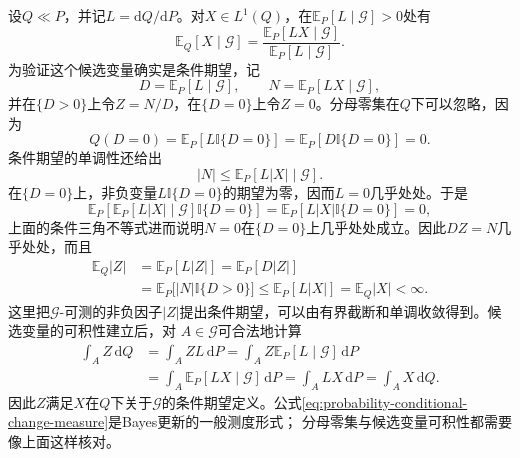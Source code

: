 设\(Q\ll P\)，并记\(L=\mathrm{d}Q/\mathrm{d}P\)。对\(X\in L^1(Q)\)，在\(\mathbb{E}_P[L\mid\mathcal{G}]>0\)处有
\begin{equation}
  \mathbb{E}_Q[X\mid\mathcal{G}]
  =
  \frac{\mathbb{E}_P[LX\mid\mathcal{G}]}
       {\mathbb{E}_P[L\mid\mathcal{G}]}.
  \label{eq:probability-conditional-change-measure}
\end{equation}
为验证这个候选变量确实是条件期望，记
\[
  D=\mathbb{E}_P[L\mid\mathcal{G}],
  \qquad
  N=\mathbb{E}_P[LX\mid\mathcal{G}],
\]
并在\(\{D>0\}\)上令\(Z=N/D\)，在\(\{D=0\}\)上令\(Z=0\)。分母零集在\(Q\)下可以忽略，因为
\[
  Q(D=0)
  =
  \mathbb{E}_P[L\mathbb{I}\{D=0\}]
  =
  \mathbb{E}_P[D\mathbb{I}\{D=0\}]
  =0.
\]
条件期望的单调性还给出
\[
  |N|
  \leq
  \mathbb{E}_P[L|X|\mid\mathcal{G}].
\]
在\(\{D=0\}\)上，非负变量\(L\mathbb{I}\{D=0\}\)的期望为零，因而\(L=0\)几乎处处。于是
\[
  \mathbb{E}_P\left[
    \mathbb{E}_P[L|X|\mid\mathcal{G}]
    \mathbb{I}\{D=0\}
  \right]
  =
  \mathbb{E}_P[L|X|\mathbb{I}\{D=0\}]
  =0,
\]
上面的条件三角不等式进而说明\(N=0\)在\(\{D=0\}\)上几乎处处成立。因此\(DZ=N\)几乎处处，而且
\[
  \begin{aligned}
    \mathbb{E}_Q|Z|
    &=
    \mathbb{E}_P[L|Z|]
    =
    \mathbb{E}_P[D|Z|]\\
    &=
    \mathbb{E}_P\bigl[|N|\mathbb{I}\{D>0\}\bigr]
    \leq
    \mathbb{E}_P[L|X|]
    =
    \mathbb{E}_Q|X|<\infty.
  \end{aligned}
\]
这里把\(\mathcal{G}\)-可测的非负因子\(|Z|\)提出条件期望，可以由有界截断和单调收敛得到。候选变量的可积性建立后，对
\(A\in\mathcal{G}\)可合法地计算
\[
  \begin{aligned}
    \int_A Z\,\mathrm{d}Q
    &=
    \int_A ZL\,\mathrm{d}P
    =
    \int_A Z\mathbb{E}_P[L\mid\mathcal{G}]\,\mathrm{d}P\\
    &=
    \int_A \mathbb{E}_P[LX\mid\mathcal{G}]\,\mathrm{d}P
    =
    \int_A LX\,\mathrm{d}P
    =
    \int_A X\,\mathrm{d}Q.
  \end{aligned}
\]
因此\(Z\)满足\(X\)在\(Q\)下关于\(\mathcal{G}\)的条件期望定义。公式\eqref{eq:probability-conditional-change-measure}是Bayes更新的一般测度形式；
分母零集与候选变量可积性都需要像上面这样核对。

